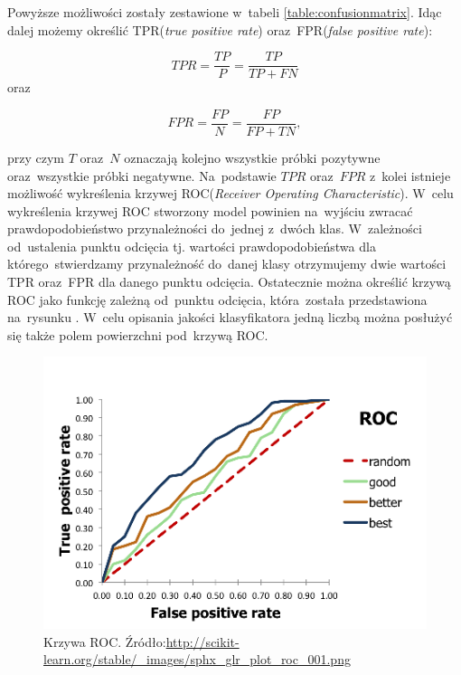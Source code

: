 \noindent
Powyższe możliwości zostały zestawione w~tabeli \ref{table:confusionmatrix}. Idąc dalej możemy określić TPR(\textit{true positive rate}) oraz~FPR(\textit{false positive rate}):


\begin{equation}
TPR = \frac{TP}{P} = \frac{TP}{TP+FN} 
\end{equation}
\noindent
oraz

\begin{equation}
FPR = \frac{FP}{N} = \frac{FP}{FP+TN},
\end{equation}

przy czym $T$ oraz~$N$ oznaczają kolejno wszystkie próbki pozytywne oraz~wszystkie próbki negatywne. Na~podstawie $TPR$ oraz~$FPR$ z~kolei istnieje możliwość wykreślenia krzywej ROC(\textit{Receiver Operating Characteristic}). W~celu wykreślenia krzywej ROC stworzony model powinien na~wyjściu zwracać prawdopodobieństwo  przynależności do~jednej z~dwóch klas. W~zależności od~ustalenia punktu odcięcia tj. wartości prawdopodobieństwa dla którego~stwierdzamy przynależność do~danej klasy otrzymujemy dwie wartości TPR oraz~FPR dla danego punktu odcięcia. Ostatecznie można określić krzywą ROC jako funkcję zależną od~punktu odcięcia, która~została przedstawiona na~rysunku \label{roc}. W~celu opisania jakości klasyfikatora jedną liczbą można posłużyć się także polem powierzchni pod~krzywą ROC.

\begin{figure}[ht!]
\centering
\includegraphics[scale=0.7]{res/roc3.png}
\caption[Caption for LOF]{Krzywa ROC. Źródło:\url{http://scikit-learn.org/stable/_images/sphx_glr_plot_roc_001.png}\label{roc}} 
\end{figure}




